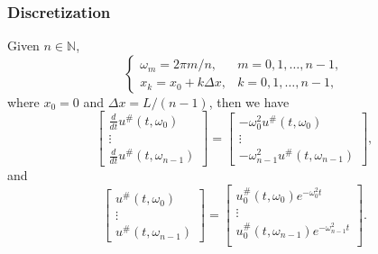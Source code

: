 \documentclass{beamer}
\begin{document}
\begin{frame}
	\frametitle{Discretization}
	Given $n \in \mathbb{N}$,
	\begin{equation*}
		\begin{cases}
			\omega_m = 2\pi m/n, & m = 0,1,\dots,n-1, \\
			x_k = x_0 + k\Delta x, & k = 0,1,\dots,n-1,
		\end{cases}
	\end{equation*}
	where $x_0 = 0$ and $\Delta x = L/(n-1)$, then we have
	\begin{equation*}
		\begin{bmatrix}
			\frac{d}{dt}u^{\#}(t,\omega_0) \\
			\vdots \\
			\frac{d}{dt}u^{\#}(t,\omega_{n-1})
		\end{bmatrix}
		=
		\begin{bmatrix}
			-\omega_0^2u^{\#}(t,\omega_0) \\
			\vdots \\
			-\omega_{n-1}^2u^{\#}(t,\omega_{n-1})
		\end{bmatrix},
	\end{equation*}
	and
	\begin{equation*}
		\begin{bmatrix}
			u^{\#}(t,\omega_0) \\
			\vdots \\
			u^{\#}(t,\omega_{n-1})
		\end{bmatrix}
		=
		\begin{bmatrix}
			u_0^{\#}(t,\omega_0)e^{-\omega_0^2t} \\
			\vdots \\
			u_0^{\#}(t,\omega_{n-1})e^{-\omega_{n-1}^2t} \\
		\end{bmatrix}.
	\end{equation*}
\end{frame}
\end{document}
